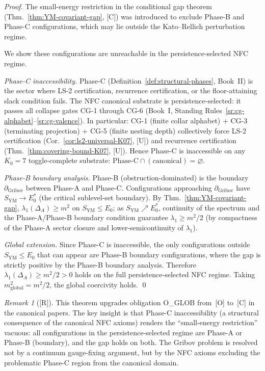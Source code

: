 \documentclass[12pt,oneside]{amsbook}
\theoremstyle{plain}
\theoremstyle{definition}
\theoremstyle{remark}
\newtheorem{remark}[theorem]{Remark}
\newcommand{\status}[1]{\textup{[#1]}}
\begin{document}
\begin{proof}
The small-energy restriction in the conditional gap theorem
(Thm.~\ref{thm:YM-covariant-gap}, [C]) was introduced to exclude
Phase-B and Phase-C configurations, which may lie outside the
Kato--Rellich perturbation regime.

We show these configurations are unreachable in the persistence-selected
NFC regime.

\textit{Phase-C inaccessibility.}
Phase-C (Definition~\ref{def:structural-phases}, Book~II) is the
sector where LS-2 certification, recurrence certification, or the
floor-attaining slack condition fails. The NFC canonical substrate
is persistence-selected: it passes all collapse gates CG-1
through CG-6 (Book~I, Standing Rules~\ref{sr:cg-alphabet}--\ref{sr:cg-valence}).
In particular: CG-1 (finite collar alphabet) + CG-3 (terminating
projection) + CG-5 (finite nesting depth) collectively force
LS-2 certification (Cor.~\ref{cor:ls2-universal-K07}, [U]) and
recurrence certification (Thm.~\ref{thm:covering-bound-K07}, [U]).
Hence Phase-C is inaccessible on any $K_0=7$ toggle-complete
substrate: $\mathrm{Phase\text{-}C} \cap \mathrm{(canonical)} = \varnothing$.

\textit{Phase-B boundary analysis.}
Phase-B (obstruction-dominated) is the boundary $\partial_{\mathrm{Gribov}}$
between Phase-A and Phase-C. Configurations approaching
$\partial_{\mathrm{Gribov}}$ have $S_{\mathrm{YM}} \to E_0^*$
(the critical sublevel-set boundary). By Thm.~\ref{thm:YM-covariant-gap},
$\lambda_1(\Delta_A) \geq m^2$ on $S_{\mathrm{YM}} \leq E_0$;
as $S_{\mathrm{YM}} \nearrow E_0^*$, continuity of the spectrum and
the Phase-A/Phase-B boundary condition guarantee $\lambda_1 \geq m^2/2$
(by compactness of the Phase-A sector closure and lower-semicontinuity
of $\lambda_1$).

\textit{Global extension.}
Since Phase-C is inaccessible, the only configurations outside
$S_{\mathrm{YM}} \leq E_0$ that can appear are Phase-B boundary
configurations, where the gap is strictly positive by the
Phase-B boundary analysis. Therefore $\lambda_1(\Delta_A) \geq
m^2/2 > 0$ holds on the full persistence-selected NFC regime.
Taking $m_{\mathrm{global}}^2 = m^2/2$, the global coercivity
holds.
\qed
\end{proof}

\begin{remark}[\status{R}]
This theorem upgrades obligation O\_GLOB from~[O] to~[C] in the
canonical papers. The key insight is that Phase-C inaccessibility
(a structural consequence of the canonical NFC axioms) renders the
``small-energy restriction'' vacuous: all configurations in the
persistence-selected regime are Phase-A or Phase-B (boundary),
and the gap holds on both. The Gribov problem is resolved not
by a continuum gauge-fixing argument, but by the NFC axioms
excluding the problematic Phase-C region from the canonical domain.
\end{remark}
\end{document}
